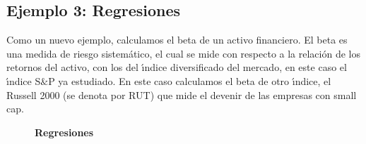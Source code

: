 \subsection{Ejemplo 3: Regresiones}
Como un nuevo ejemplo, calculamos el beta de un activo financiero. El beta es una medida de riesgo sistem\'atico, el cual se mide con respecto a la relaci\'on de los retornos del activo, con los del \'\i{}ndice diversificado del mercado, en este caso el \'\i{}ndice S$\&$P ya estudiado. En este caso calculamos el beta de otro \'\i{}ndice, el Russell 2000 (se denota por RUT) que mide el devenir de las empresas con small cap. 

\begin{figure}[h]
	\centering
	\textbf{Regresiones}\par\medskip
\end{figure}


